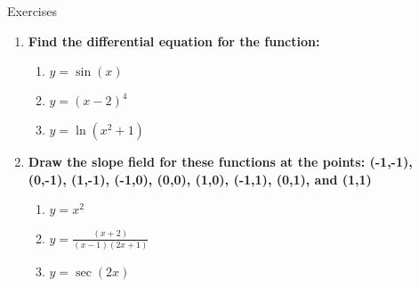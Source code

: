 \documentclass[../revisedmain.tex]{subfiles}
\begin{document}
\newpage
\begin{center}
	\LARGE Exercises
\end{center}
\begin{enumerate}
	\item \textbf{Find the differential equation for the function:}
	\begin{enumerate}
		\item $y=\sin(x)$
		\item $y=(x-2)^4$
		\item $y=\ln(x^2+1)$
	\end{enumerate}
	\item \textbf{Draw the slope field for these functions at the points: (-1,-1), (0,-1), (1,-1), (-1,0), (0,0), (1,0), (-1,1), (0,1), and (1,1)}
	\begin{enumerate}
		\item $y=x^2$
		\item $y=\displaystyle\frac{(x+2)}{(x-1)(2x+1)}$
		\item $y=\sec(2x)$
	\end{enumerate}
\end{enumerate}
\end{document}
